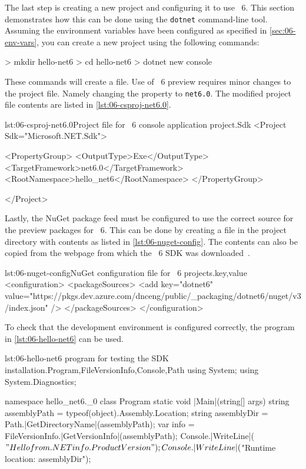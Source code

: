 The last step is creating a new project and configuring it to use \dotnet{}~6. This section
demonstrates how this can be done using the \verb|dotnet| command-line tool. Assuming the
environment variables have been configured as specified in \autoref{sec:06-env-vars}, you can create
a new project using the following commands:

\begin{myVerbatim}
> mkdir hello-net6
> cd hello-net6
> dotnet new console
\end{myVerbatim}

These commands will create a  file. Use of \dotnet{}~6
preview requires minor changes to the project file. Namely changing the 
property to \verb|net6.0|. The modified project file contents are listed in
\autoref{lst:06-csproj-net6.0}.

\begin{myListingXml}{lst:06-csproj-net6.0}{Project file for \dotnet{}~6 console application project.}{Sdk}
<Project Sdk="Microsoft.NET.Sdk">

  <PropertyGroup>
    <OutputType>Exe</OutputType>
    <TargetFramework>net6.0</TargetFramework>
    <RootNamespace>hello_net6</RootNamespace>
  </PropertyGroup>

</Project>
\end{myListingXml}

Lastly, the NuGet package feed must be configured to use the correct source for the preview packages
for \dotnet{}~6. This can be done by creating a  file in the project
directory with contents as listed in \autoref{lst:06-nuget-config}. The contents can also be copied
from the webpage from which the \dotnet{}~6 SDK was downloaded~\cite{dotnetSdkGithub}.

\begin{myListingXml}[basicstyle=\ttfamily\scriptsize]{lst:06-nuget-config}{NuGet configuration file for \dotnet{}~6 projects.}{key,value}
<configuration>
  <packageSources>
    <add key="dotnet6"
      value="https://pkgs.dev.azure.com/dnceng/public/_packaging/dotnet6/nuget/v3/index.json" />
  </packageSources>
</configuration>
\end{myListingXml}

To check that the development environment is configured correctly, the program in
\autoref{lst:06-hello-net6} can be used.

\begin{myListingCsharp}{lst:06-hello-net6}{\csharp{} program for testing the SDK installation.}{Program,FileVersionInfo,Console,Path}{}
using System;
using System.Diagnostics;

namespace hello_net6._0
{
    class Program
    {
        static void |Main|(string[] args)
        {
            string assemblyPath = typeof(object).Assembly.Location;
            string assemblyDir = Path.|GetDirectoryName|(assemblyPath);
            var info = FileVersionInfo.|GetVersionInfo|(assemblyPath);
            Console.|WriteLine|($"Hello from .NET {info.ProductVersion}");
            Console.|WriteLine|($"Runtime location: {assemblyDir}");
        }
    }
}
\end{myListingCsharp}

